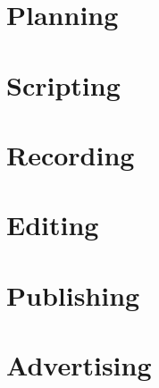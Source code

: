 \section{Planning}


\section{Scripting}


\section{Recording}


\section{Editing}


\section{Publishing}


\section{Advertising}
